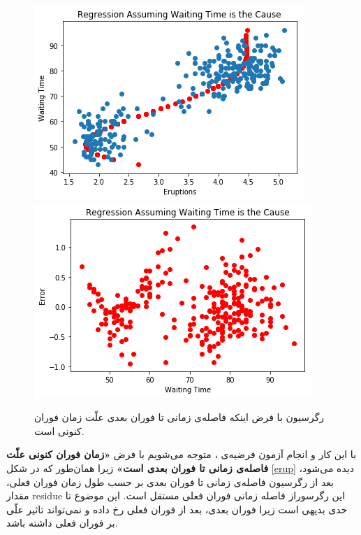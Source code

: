 \documentclass[papersize=a4]{report}
\begin{document}
\begin{figure}[h]
	\begin{floatrow}
		\centering
		\includegraphics[scale=0.451]{waiting_time1.png}
		\includegraphics[scale=0.451]{waiting_time2.png}
	\end{floatrow}
	\caption{رگرسیون با فرض اینکه فاصله‌ی زمانی تا فوران بعدی علّت زمان فوران کنونی است.}
	\label{wait}
\end{figure}
با این کار و انجام آزمون فرضیه‌ی ، متوجه می‌شویم با فرض 
\textbf{«زمان فوران کنونی علّت فاصله‌ی زمانی تا فوران بعدی است» }
زیرا همان‌طور که در شکل \eqref{erup} دیده‌ می‌شود، بعد از رگرسیون فاصله‌ی زمانی تا فوران بعدی بر حسب طول زمان فوران فعلی، مقدار residue این رگرسوراز فاصله‌ زمانی فوران فعلی مستقل است. این موضوع تا حدی بدیهی است زیرا فوران بعدی، بعد از فوران فعلی رخ داده و نمی‌تواند تاثیر علّی بر فوران فعلی داشته باشد.
\end{document}

